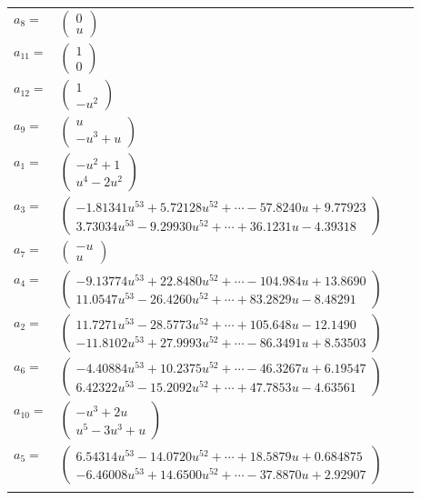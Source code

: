 \documentclass[1p]{elsarticle_modified}
\theoremstyle{definition}
\begin{document}
\begin{tabular}{m{7pt} m{180pt} m{7pt} m{180pt} }
\flushright $a_{8}=$&$\begin{pmatrix}0\\u\end{pmatrix}$ \\
\flushright $a_{11}=$&$\begin{pmatrix}1\\0\end{pmatrix}$ \\
\flushright $a_{12}=$&$\begin{pmatrix}1\\- u^2\end{pmatrix}$ \\
\flushright $a_{9}=$&$\begin{pmatrix}u\\- u^3+u\end{pmatrix}$ \\
\flushright $a_{1}=$&$\begin{pmatrix}- u^2+1\\u^4-2 u^2\end{pmatrix}$ \\
\flushright $a_{3}=$&$\begin{pmatrix}-1.81341 u^{53}+5.72128 u^{52}+\cdots-57.8240 u+9.77923\\3.73034 u^{53}-9.29930 u^{52}+\cdots+36.1231 u-4.39318\end{pmatrix}$ \\
\flushright $a_{7}=$&$\begin{pmatrix}- u\\u\end{pmatrix}$ \\
\flushright $a_{4}=$&$\begin{pmatrix}-9.13774 u^{53}+22.8480 u^{52}+\cdots-104.984 u+13.8690\\11.0547 u^{53}-26.4260 u^{52}+\cdots+83.2829 u-8.48291\end{pmatrix}$ \\
\flushright $a_{2}=$&$\begin{pmatrix}11.7271 u^{53}-28.5773 u^{52}+\cdots+105.648 u-12.1490\\-11.8102 u^{53}+27.9993 u^{52}+\cdots-86.3491 u+8.53503\end{pmatrix}$ \\
\flushright $a_{6}=$&$\begin{pmatrix}-4.40884 u^{53}+10.2375 u^{52}+\cdots-46.3267 u+6.19547\\6.42322 u^{53}-15.2092 u^{52}+\cdots+47.7853 u-4.63561\end{pmatrix}$ \\
\flushright $a_{10}=$&$\begin{pmatrix}- u^3+2 u\\u^5-3 u^3+u\end{pmatrix}$ \\
\flushright $a_{5}=$&$\begin{pmatrix}6.54314 u^{53}-14.0720 u^{52}+\cdots+18.5879 u+0.684875\\-6.46008 u^{53}+14.6500 u^{52}+\cdots-37.8870 u+2.92907\end{pmatrix}$\\&\end{tabular}
\end{document}
